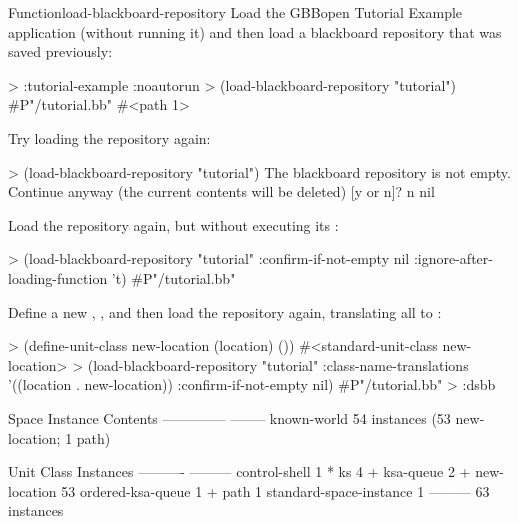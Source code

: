 \documentclass[10pt,twoside,english,pdftex]{article}
\begin{document}
\begin{functiondoc}{Function}{load-blackboard-repository}
\fnexamples Load the GBBopen Tutorial Example application (without running it)
and then load a blackboard repository that was saved previously:
%
\W\supp
\begin{example}
  > :tutorial-example :noautorun 
  > (load-blackboard-repository "tutorial")
  #P"/tutorial.bb"
  #<path 1>
\end{example}
%
Try loading the repository again:
%
\W\supp\notpretop
\begin{example}
  > (load-blackboard-repository "tutorial")
  The blackboard repository is not empty.
  Continue anyway (the current contents will be deleted) [y or n]? n
  nil
\end{example}
%
Load the repository again, but without executing its
:
%
\W\supp\notpretop
\begin{example}
  > (load-blackboard-repository "tutorial" 
      :confirm-if-not-empty nil
      :ignore-after-loading-function 't)
  #P"/tutorial.bb"
\end{example}
%
Define a new , , and then load the
repository again, translating all   to
 :
%
\W\supp
\begin{example}
  > (define-unit-class new-location (location) ())
  #<standard-unit-class new-location>
  > (load-blackboard-repository "tutorial"
      :class-name-translations '((location . new-location))
      :confirm-if-not-empty nil)
  #P"/tutorial.bb"
  > :dsbb

  Space Instance                Contents
  --------------                --------
  known-world                   54 instances (53 new-location; 1 path)

  Unit Class                    Instances
  ----------                    ---------
  control-shell                         1 *
  ks                                    4 +
  ksa-queue                             2 +
  new-location                         53  
  ordered-ksa-queue                     1 +
  path                                  1  
  standard-space-instance               1  
                                ---------
                                       63 instances
\end{example}

\end{functiondoc}

\end{document}
